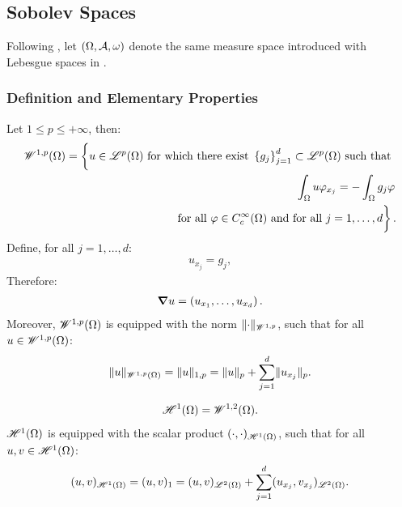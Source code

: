 \newpage
\subsection{Sobolev Spaces}

Following \cite[p.~267]{Brezis2010}, let $(\Omega, \mathcal{A}, \omega)$ denote the same measure space introduced with Lebesgue spaces in .

\subsubsection{Definition and Elementary Properties}

\begin{definition}
    Let $1 \leq p \leq +\infty$, then:
    \begin{align} %
        \SpaceWkp{1}{p}(\Omega) = \left\{ \vphantom{\int_{\Omega}} u \in \SpaceLp{p}(\Omega) \text{ for which there exist } \left\{ g_j \right\}_{j = 1}^{d} \subset \SpaceLp{p}(\Omega) \text{ such that } \right. \notag \\ 
        \left. \int_{\Omega} u \varphi_{x_j} = - \int_{\Omega} g_j \varphi \right. \notag \\
        \left. \text{ for all } \varphi \in C_c^{\infty}(\Omega) \text{ and for all } j = 1, \dots, d \vphantom{\int_{\Omega}} \right\}.
    \end{align}
    Define, for all $j = 1, \dots, d$:
    \begin{align}
        u_{x_j} = g_j,
    \end{align}
    Therefore:
    \begin{align}
        \bm{\nabla} u = \left( u_{x_1}, \dots, u_{x_d} \right).
    \end{align}
    Moreover, $\mathscr{W}^{1, p}(\Omega)$ is equipped with the norm $\lVert \cdot \rVert_{\mathscr{W}^{1, p}}$, such that for all $u \in \mathscr{W}^{1, p}(\Omega)$:
    \begin{align}
        \lVert u \rVert_{\mathscr{W}^{1, p}(\Omega)} = \lVert u \rVert_{1, p} = \lVert u \rVert_p + \sum_{j = 1}^d \lVert u_{x_j} \rVert_p.
    \end{align}
\end{definition}

\begin{definition}
    \begin{align}
        \mathscr{H}^{1}(\Omega) = \mathscr{W}^{1, 2}(\Omega).
    \end{align}
    $\mathscr{H}^{1}(\Omega)$ is equipped with the scalar product $(\cdot, \cdot)_{\mathscr{H}^{1}(\Omega)}$, such that for all $u, v \in \mathscr{H}^{1}(\Omega)$:
    \begin{align}
        (u, v)_{\mathscr{H}^{1}(\Omega)} = (u, v)_1 = (u, v)_{\mathscr{L}^{2}(\Omega)} + \sum_{j = 1}^d (u_{x_j}, v_{x_j})_{\mathscr{L}^{2}(\Omega)}.
    \end{align}
\end{definition}

